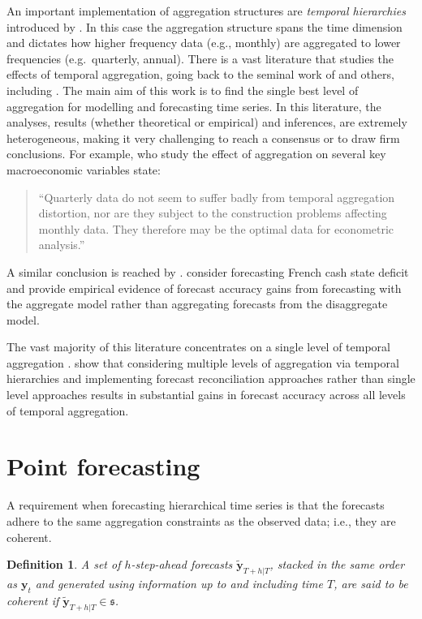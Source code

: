 \documentclass[a4paper, 11pt]{article}
\newtheorem{definition}{Definition}[section]
\begin{document}
An important implementation of aggregation structures are \textit{temporal hierarchies} introduced by \citet{AthEtAl2017}. In this case the aggregation structure spans the time dimension and dictates how higher frequency data (e.g., monthly) are aggregated to lower frequencies (e.g.\ quarterly, annual). There is a vast literature that studies the effects of temporal aggregation, going back to the seminal work of \citet{ZelMon1971, AmeWu1972, Tia1972, Bre1973} and others, including \citet{Hot1993, HotCar1993, Mar1999, SilEtAl2008}. The main aim of this work is to find the single best level of aggregation for modelling and forecasting time series. In this literature, the analyses, results (whether theoretical or empirical) and inferences, are extremely heterogeneous, making it very challenging to reach a consensus or to draw firm conclusions. For example, \citet{RosSea1995} who study the effect of aggregation on several key macroeconomic variables state:
\begin{quote}
	``Quarterly data do not seem to suffer badly from temporal aggregation distortion, nor are they subject to the construction problems affecting monthly data. They therefore may be the optimal data for econometric analysis.''
\end{quote}
A similar conclusion is reached by \citet{NijPal1990}. \citet{SilEtAl2008} consider forecasting French cash state deficit and provide empirical evidence of forecast accuracy gains from forecasting with the aggregate model rather than aggregating forecasts from the disaggregate model.

The vast majority of this literature concentrates on a single level of temporal aggregation \citep[although there are some notable exceptions such as][]{AndEtAl2011,KouEtAl2014}. \citet{AthEtAl2017} show that considering multiple levels of aggregation via temporal hierarchies and implementing forecast reconciliation approaches rather than single level approaches results in substantial gains in forecast accuracy across all levels of temporal aggregation.

\section{Point forecasting}\label{sec:point forecasting}

A requirement when forecasting hierarchical time series is that the forecasts adhere to the same aggregation constraints as the observed data; i.e., they are coherent.

\begin{definition}\label{def:coherence}
	A set of $h$-step-ahead forecasts $\tilde{\bm{y}}_{T+h|T}$, stacked in the same order as $\bm{y}_{t}$ and generated using information up to and including time $T$, are said to be \textit{coherent} if $\tilde{\bm{y}}_{T+h|T} \in \mathfrak{s}$.
\end{definition}
\end{document}
